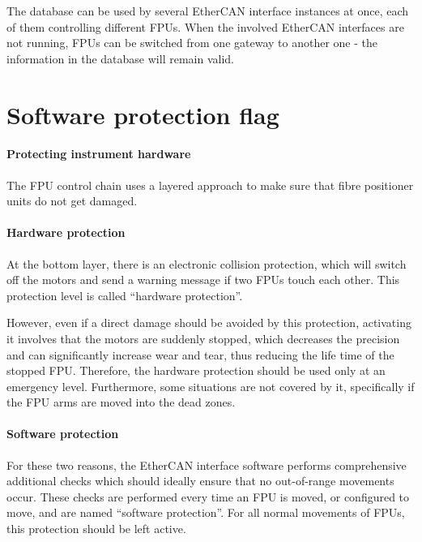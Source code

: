 \documentclass[fontsize=12,a4paper]{scrreprt}
\begin{document}
The database can be used by several EtherCAN interface instances at once, each of
them controlling different FPUs. When the involved EtherCAN interfaces are not
running, FPUs can be switched from one gateway to another one - the
information in the database will remain valid.

\section{Software protection flag}
\label{sec:protectionintro}
\paragraph{Protecting instrument hardware}
The FPU control chain uses a layered approach to make sure that fibre
positioner units do not get damaged.

\paragraph{Hardware protection}
At the bottom layer, there is an electronic collision protection,
which will switch off the motors and send a warning message if two
FPUs touch each other. This protection level is called ``hardware
protection''.

 

However, even if a direct damage should be avoided by this protection,
activating it involves that the motors are suddenly stopped, which
decreases the precision and can significantly increase wear and tear,
thus reducing the life time of the stopped FPU. Therefore, the
hardware protection should be used only at an emergency
level. Furthermore, some situations are not covered by it,
specifically if the FPU arms are moved into the dead zones.

\paragraph{Software protection}
For these two reasons, the EtherCAN interface software performs
comprehensive additional checks which should ideally ensure that no
out-of-range movements occur. These checks are performed every time an
FPU is moved, or configured to move, and are named ``software
protection''.  For all normal movements of FPUs, this protection
should be left active.
\end{document}
